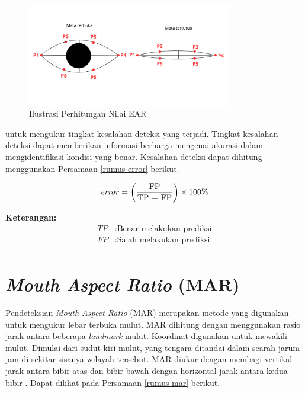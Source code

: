     \begin{figure}[H]
      \centering
      \includegraphics[width=0.8\textwidth]{figures/bab2/EAR.png}
      \caption{Ilustrasi Perhitungan Nilai EAR}
      \label{Ilustrasi Perhitungan Nilai EAR}
    \end{figure}
    
     untuk mengukur tingkat kesalahan deteksi yang terjadi. Tingkat kesalahan deteksi dapat memberikan informasi berharga mengenai akurasi dalam mengidentifikasi kondisi yang benar. Kesalahan deteksi dapat dihitung menggunakan Persamaan \ref{rumus error} berikut.


    \begin{equation}
        \label{rumus error}
        \begin{aligned}
        \text{\textit{error}} = \left(\frac{\text{FP}}{\text{TP + FP}}\right) \times 100\%
        \end{aligned}
    \end{equation}

       \textbf{Keterangan:}
      \begin{align*}
        TP & : \text{Benar melakukan prediksi} \\
        FP & : \text{Salah melakukan prediksi} \\
    \end{align*}

   

\section{\textit{Mouth Aspect Ratio} (MAR)}

Pendeteksian \textit{Mouth Aspect Ratio} (MAR) merupakan metode yang digunakan untuk mengukur lebar terbuka mulut. MAR dihitung dengan menggunakan rasio jarak antara beberapa \textit{landmark} mulut. Koordinat digunakan untuk mewakili mulut. Dimulai dari
sudut kiri mulut, yang tengara ditandai dalam searah jarum jam di sekitar sisanya
wilayah tersebut. MAR diukur dengan membagi vertikal jarak antara bibir atas dan bibir bawah dengan horizontal jarak antara kedua bibir \cite{inproceedings, jimaging9050091}. Dapat dilihat pada Persamaan \ref{rumus mar} berikut.


